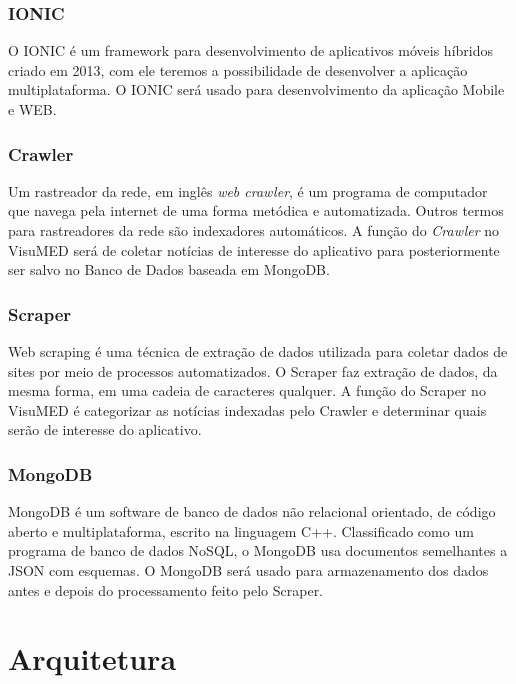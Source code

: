 \documentclass[
	12pt,				%
	openright,			%
	twoside,			%
	a4paper,			%
	english,			%
	french,				%
	spanish,			%
	brazil,				%
	]{abntex2}
\begin{document}
\subsection*{IONIC}

O IONIC é um framework para desenvolvimento de aplicativos móveis híbridos criado em 2013, com ele teremos a possibilidade de desenvolver a aplicação multiplataforma. O IONIC  será usado para desenvolvimento da aplicação Mobile e WEB. 

\subsection*{Crawler}

Um rastreador da rede, em inglês \textit{web crawler}, é um programa de computador que navega pela internet de uma forma metódica e automatizada. Outros termos para rastreadores da rede são indexadores automáticos. A função do \textit{Crawler} no VisuMED será de coletar notícias de interesse do aplicativo para posteriormente ser salvo no Banco de Dados baseada em MongoDB.

\subsection*{Scraper}

Web scraping é uma técnica de extração de dados utilizada para coletar dados de sites por meio de processos automatizados. O Scraper faz extração de dados, da mesma forma, em uma cadeia de caracteres qualquer. A função do Scraper no VisuMED é categorizar as notícias indexadas pelo Crawler e determinar quais serão de interesse do aplicativo.

\subsection*{MongoDB}

MongoDB é um software de banco de dados não relacional orientado, de código aberto e multiplataforma, escrito na linguagem C++. Classificado como um programa de banco de dados NoSQL, o MongoDB usa documentos semelhantes a JSON com esquemas. O MongoDB será usado para armazenamento dos dados antes e depois do processamento feito pelo Scraper.


\chapter{Arquitetura}
\end{document}
